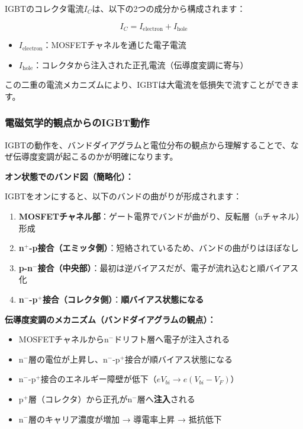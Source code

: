 IGBTのコレクタ電流$I_C$は、以下の2つの成分から構成されます：

\begin{equation}
I_C = I_{\text{electron}} + I_{\text{hole}}
\end{equation}

\begin{itemize}
\item $I_{\text{electron}}$：MOSFETチャネルを通じた電子電流
\item $I_{\text{hole}}$：コレクタから注入された正孔電流（伝導度変調に寄与）
\end{itemize}

この二重の電流メカニズムにより、IGBTは大電流を低損失で流すことができます。

\subsubsection{電磁気学的観点からのIGBT動作}

IGBTの動作を、バンドダイアグラムと電位分布の観点から理解することで、なぜ伝導度変調が起こるのかが明確になります。

\textbf{オン状態でのバンド図（簡略化）：}

IGBTをオンにすると、以下のバンドの曲がりが形成されます：

\begin{enumerate}
\item \textbf{MOSFETチャネル部}：ゲート電界でバンドが曲がり、反転層（nチャネル）形成
\item \textbf{n$^+$-p接合（エミッタ側）}：短絡されているため、バンドの曲がりはほぼなし
\item \textbf{p-n$^-$接合（中央部）}：最初は逆バイアスだが、電子が流れ込むと順バイアス化
\item \textbf{n$^-$-p$^+$接合（コレクタ側）}：\textbf{順バイアス状態になる}
\end{enumerate}

\textbf{伝導度変調のメカニズム（バンドダイアグラムの観点）：}

\begin{itemize}
\item MOSFETチャネルからn$^-$ドリフト層へ電子が注入される
\item n$^-$層の電位が上昇し、n$^-$-p$^+$接合が順バイアス状態になる
\item n$^-$-p$^+$接合のエネルギー障壁が低下（$eV_{bi} \rightarrow e(V_{bi} - V_F)$）
\item p$^+$層（コレクタ）から正孔がn$^-$層へ\textbf{注入}される
\item n$^-$層のキャリア濃度が増加 → 導電率上昇 → 抵抗低下
\end{itemize}

